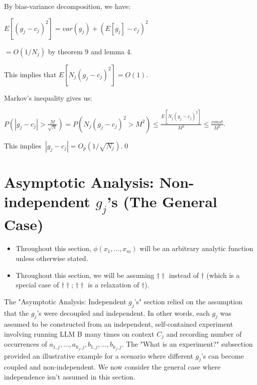 \documentclass{article}
\begin{document}
By bias-variance decomposition, we have:

$\displaystyle E\left[\left( g_{j} -c_{j}\right)^{2}\right] =var\left( g_{j}\right) +\left( E\left[ g_{j}\right] -c_{j}\right)^{2}$

$\displaystyle =O\left( 1/N_{j}\right)$ by theorem 9 and lemma 4.

This implies that $\displaystyle E\left[ N_{j}\left( g_{j} -c_{j}\right)^{2}\right] =O\left( 1\right)$.

Markov's inequality gives us:

$\displaystyle P\left( |g_{j} -c_{j} | >\frac{M}{\sqrt{N}}\right) =P\left( N_{j}\left( g_{j} -c_{j}\right)^{2}  >M^{2}\right) \leqslant \frac{E\left[ N_{j}\left( g_{j} -c_{j}\right)^{2}\right]}{M^{2}} \leqslant \frac{const}{M^{2}}$.

This implies $\displaystyle \ |g_{j} -c_{j} |=O_{p}\left( 1/\sqrt{N_{j}}\right)$.\qed 



\section{Asymptotic Analysis: Non-independent $g_{j}$'s (The General Case)}
\begin{mdframed}
    \begin{itemize}
    \item Throughout this section, $\phi(x_1, \dots, x_m)$ will be an arbitrary analytic function unless otherwise stated.
    \item Throughout this section, we will be assuming $\dagger\dagger$ instead of $\dagger$ (which is a special case of $\dagger\dagger$; $\dagger\dagger$ is a relaxation of $\dagger$).
\end{itemize}
\end{mdframed}


The "Asymptotic Analysis: Independent $\displaystyle g_{j}$'s" section relied on the assumption that the $\displaystyle g_{j}$'s were decoupled and independent. In other words, each $\displaystyle g_{j}$ was assumed to be constructed from an independent, self-contained experiment involving running LLM B many times on context $\displaystyle C_{j}$ and recording number of occurrences of $\displaystyle a_{1,j} ,...,a_{k_{j} ,j} ,b_{1,j} ,...,b_{k_{j} ,j}$. The "What is an experiment?" subsection provided an illustrative example for a scenario where different $\displaystyle g_{j}$'s can become coupled and non-independent. We now consider the general case where independence isn't assumed in this section.
\end{document}
